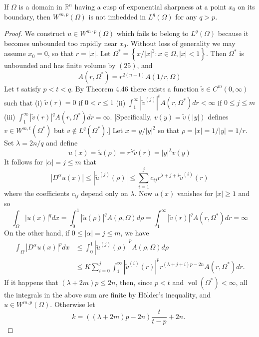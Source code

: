 \begin{theorem}
  If $\Omega$ is a domain in $\mathbb{R}^n$ having a cusp of exponential sharpness at a point $x_0$ on its boundary, then $W^{m, p}(\Omega)$ is not imbedded in $L^q(\Omega)$ for any $q>p$.
\end{theorem}

\begin{proof}
  We construct $u \in W^{m \cdot p}(\Omega)$ which fails to belong to $L^q(\Omega)$ because it becomes unbounded too rapidly near $x_0$. Without loss of generality we may assume $x_0=0$, so that $r=|x|$. Let $\Omega^*=\left\{x /|x|^2: x \in \Omega,|x|<1\right\}$. Then $\Omega^*$ is unbounded and has finite volume by $(25)$, and
  \[
  A\left(r, \Omega^*\right)=r^{2(n-1)} A(1 / r, \Omega)
  \]
  Let $t$ satisfy $p<t<q$. By Theorem 4.46 there exists a function $\tilde{v} \in C^m(0, \infty)$ such that
  (i) $\tilde{v}(r)=0$ if $0<r \leq 1$
  (ii) $\int_1^{\infty}\left|\tilde{v}^{(j)}\right|^t A\left(r, \Omega^*\right) d r<\infty$ if $0 \leq j \leq m$
  (iii) $\int_1^{\infty}|\tilde{v}(r)|^q A\left(r, \Omega^*\right) d r=\infty$.
  [Specifically, $v(y)=\tilde{v}(|y|)$ defines $v \in W^{m, t}\left(\Omega^*\right)$ but $v \notin L^q\left(\Omega^*\right)$.] Let $x=y /|y|^2$ so that $\rho=|x|=1 /|y|=1 / r$. Set $\lambda=2 n / q$ and define
  \[
  u(x)=\tilde{u}(\rho)=r^\lambda \tilde{v}(r)=|y|^\lambda v(y)
  \]
  It follows for $|\alpha|=j \leq m$ that
  \[
  \left|D^\alpha u(x)\right| \leq\left|\tilde{u}^{(j)}(\rho)\right| \leq \sum_{i=1}^j c_{i j} r^{\lambda+j+i} \tilde{v}^{(i)}(r)
  \]
  where the coefficients $c_{i j}$ depend only on $\lambda$. Now $u(x)$ vanishes for $|x| \geq 1$ and so
  \[
  \int_{\Omega}|u(x)|^q d x=\int_0^1|\tilde{u}(\rho)|^q A(\rho, \Omega) d \rho=\int_1^{\infty}|\tilde{v}(r)|^q A\left(r, \Omega^*\right) d r=\infty
  \]
  On the other hand, if $0 \leq|\alpha|=j \leq m$, we have
  \[
  \begin{aligned}
  \int_{\Omega}\left|D^\alpha u(x)\right|^p d x & \leq \int_0^1\left|\tilde{u}^{(j)}(\rho)\right|^p A(\rho, \Omega) d \rho \\
  & \leq K \sum_{i=0}^j \int_1^{\infty}\left|\tilde{v}^{(i)}(r)\right|^p r^{(\lambda+j+i) p-2 n} A\left(r, \Omega^*\right) d r .
  \end{aligned}
  \]
  If it happens that $(\lambda+2 m) p \leq 2 n$, then, since $p<t$ and $\operatorname{vol}\left(\Omega^*\right)<\infty$, all the integrals in the above sum are finite by Hölder's inequality, and $u \in W^{m, p}(\Omega)$. Otherwise let
  \[
  k=((\lambda+2 m) p-2 n) \frac{t}{t-p}+2 n \text {. }
\]
\end{proof}
